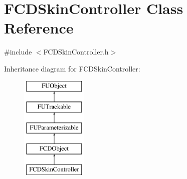 \hypertarget{classFCDSkinController}{
\section{FCDSkinController Class Reference}
\label{classFCDSkinController}
}


{\ttfamily \#include $<$FCDSkinController.h$>$}

Inheritance diagram for FCDSkinController:\begin{figure}[H]
\begin{center}
\leavevmode
\includegraphics[height=5.000000cm]{classFCDSkinController}
\end{center}
\end{figure}
